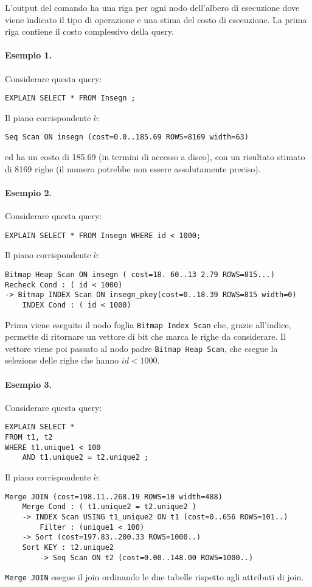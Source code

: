 \documentclass[a4paper, 10pt]{article}
\begin{document}
	L'output del comando ha una riga per ogni nodo dell'albero di esecuzione dove viene indicato il tipo di operazione e una stima del costo di esecuzione. La prima riga contiene il costo complessivo della query.
	
	\paragraph{Esempio 1.}
	Considerare questa query:
	\begin{lstlisting}
EXPLAIN SELECT * FROM Insegn ;
	\end{lstlisting}
	Il piano corrispondente è:
	\begin{lstlisting}
Seq Scan ON insegn (cost=0.0..185.69 ROWS=8169 width=63)
	\end{lstlisting}
	ed ha un costo di 185.69 (in termini di accesso a disco), con un risultato stimato di 8169 righe (il numero potrebbe non essere assolutamente preciso).
	
	\paragraph{Esempio 2.} 
	Considerare questa query:
	\begin{lstlisting}
EXPLAIN SELECT * FROM Insegn WHERE id < 1000;
	\end{lstlisting}
	Il piano corrispondente è:
	\begin{lstlisting}
Bitmap Heap Scan ON insegn ( cost=18. 60..13 2.79 ROWS=815...)
Recheck Cond : ( id < 1000)
-> Bitmap INDEX Scan ON insegn_pkey(cost=0..18.39 ROWS=815 width=0)
	INDEX Cond : ( id < 1000)
	\end{lstlisting}
	Prima viene eseguito il nodo foglia \lstinline|Bitmap Index Scan| che, grazie all'indice, permette di ritornare un vettore di bit che marca le righe da considerare. Il vettore viene poi passato al nodo padre \lstinline|Bitmap Heap Scan|, che esegue la selezione delle righe che hanno $id < 1000$.
	
	\paragraph{Esempio 3.}
		Considerare questa query:
	\begin{lstlisting}
EXPLAIN SELECT *
FROM t1, t2
WHERE t1.unique1 < 100 
	AND t1.unique2 = t2.unique2 ;
	\end{lstlisting}
	Il piano corrispondente è:
	\begin{lstlisting}
Merge JOIN (cost=198.11..268.19 ROWS=10 width=488)
	Merge Cond : ( t1.unique2 = t2.unique2 )
	-> INDEX Scan USING t1_unique2 ON t1 (cost=0..656 ROWS=101..)
		Filter : (unique1 < 100)
	-> Sort (cost=197.83..200.33 ROWS=1000..)
	Sort KEY : t2.unique2
		-> Seq Scan ON t2 (cost=0.00..148.00 ROWS=1000..)
	\end{lstlisting}
	\lstinline|Merge JOIN| esegue il join ordinando le due tabelle rispetto agli attributi di join. \\
	
\end{document}
